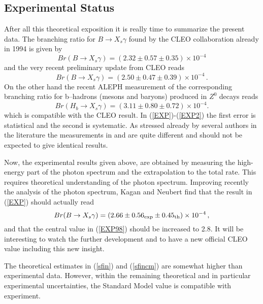 \subsection{Experimental Status}
After all this theoretical exposition it is really time to summarize
the present data.
The branching ratio for $B \to X_s \gamma$  found 
by the CLEO collaboration already in 1994 \cite{CLEO2} is given by
\begin{equation}\label{EXP}
Br(B \to X_s\gamma) = (2.32 \pm 0.57 \pm 0.35) \times 10^{-4}
\end{equation}
and the very recent preliminary update from CLEO reads \cite{CLEO98}
\begin{equation}\label{EXP98}
Br(B \to X_s\gamma) = (2.50 \pm 0.47 \pm 0.39) \times 10^{-4}\,.
\end{equation}
On the other hand the recent ALEPH measurement of the corresponding
branching ratio for b--hadrons (mesons and baryons) produced
in $Z^0$ decays
reads \cite{ALEPH}
\begin{equation}\label{EXP2}
Br(H_b \to X_s\gamma) = (3.11 \pm 0.80 \pm 0.72) \times 10^{-4}.
\end{equation}
which is compatible with the CLEO result.
In (\ref{EXP})-(\ref{EXP2})
 the first error is statistical and the second is systematic.
As stressed already by several authors in the literature the
measurements in \cite{CLEO2} and \cite{ALEPH} are quite different
and should not be expected to give identical results.

Now, the experimental results given above, are obtained by
measuring the high-energy part of the photon spectrum and the
extrapolation to the total rate. This requires theoretical
understanding of the photon spectrum. Improving recently the
analysis of the photon spectrum, Kagan and Neubert \cite{KN98}
find that the result in (\ref{EXP}) should actually read
\begin{equation}\label{EXPKN}
Br(B \to X_s\gamma) = (2.66 \pm 0.56_{\rm exp} \pm 0.45_{\rm th})
\times 10^{-4}\,,
\end{equation}
and that the central value in (\ref{EXP98}) should be increased
to 2.8. It will be interesting to watch the further development
and to have a new official CLEO value including this new insight.

The theoretical estimates in (\ref{sfin}) and (\ref{sfincm}) 
are somewhat higher than experimental data.
However, within
 the remaining theoretical
and in particular experimental uncertainties, the Standard Model value
is compatible with experiment. 
